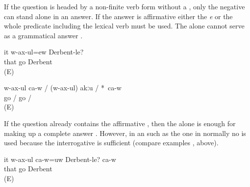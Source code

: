 If the question is headed by a non-finite verb form without a , only the negative  can stand alone in an answer. If the answer is affirmative either the  \textit{e}  or the whole predicate including the lexical verb must be used. The  alone cannot serve as a grammatical answer .
%
\begin{exe}
	\ex	\label{ex:Is he going to Derbent}
	\gll	it	w-ax-ul=ew	Derbent-le?\\
		that	go	Derbent\\
	\glt	{} (E)

	\ex	\label{ex:He is going / not going}
	\gll	w-ax-ul		ca-w	/	(w-ax-ul)		akːu		/	*~ca-w\\
		go		/	go		/	{\hphantom{*}}~\\
	\glt	{} (E)
\end{exe}

If the question already contains the affirmative , then the  alone is enough for making up a complete answer . However, in an  such as the one in  normally no  is used because the interrogative  is sufficient (compare examples ,  above).
%
\begin{exe}
	\ex	\label{ex:Is he going to Derbent? Yes, he is}
	\gll	it	w-ax-ul	ca-w=uw	Derbent-le?	ca-w\\
		that	go		Derbent	\\
	\glt	{} (E)
\end{exe}

